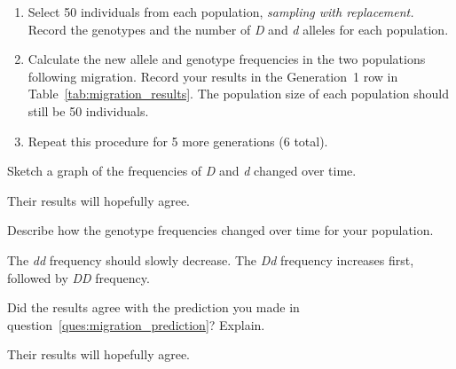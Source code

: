 \documentclass[12pt]{exam}
\newcommand*\AnswerBox[2]{%
    \parbox[t][#1]{0.92\textwidth}{%
    \begin{solution}#2\end{solution}}
    \vspace*{\stretch{1}}
}
\newcommand{\allele}[1]{\textit{#1}}
\begin{document}
\begin{questions}
\begin{enumerate}
	\item Select 50 individuals from each population, \emph{sampling with replacement.} Record the genotypes and the number of \allele{D} and \allele{d} alleles for each population.
	
	\item Calculate the new allele and genotype frequencies in the two populations following migration. Record your results in the Generation~1 row in Table~\ref{tab:migration_results}. The population size of each population should still be 50 individuals.
	
	\item Repeat this procedure for 5 more generations (6 total). 

\end{enumerate}

\question
Sketch a graph of the frequencies of \allele{D} and \allele{d} changed over time.

\AnswerBox{4\baselineskip}{Their results will hopefully agree.}

\question
Describe how the genotype frequencies changed over time for your population.

\AnswerBox{2\baselineskip}{The \allele{dd} frequency should slowly decrease. The \allele{Dd} frequency increases first, followed by \allele{DD} frequency.}

\question
Did the results agree with the prediction you made in question~\ref{ques:migration_prediction}? Explain.

\AnswerBox{4\baselineskip}{Their results will hopefully agree.}


\begin{landscape}


\end{landscape}
\end{questions}
\end{document}
